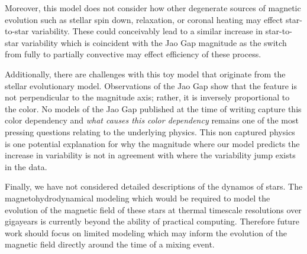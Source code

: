 Moreover, this model does not consider how other degenerate sources of magnetic
evolution such as stellar spin down, relaxation, or coronal heating may effect
star-to-star variability. These could conceivably lead to a similar increase in
star-to-star variability which is coincident with the Jao Gap magnitude as the
switch from fully to partially convective may effect efficiency of these
process.

Additionally, there are challenges with this toy model that originate from the
stellar evolutionary model. Observations of the Jao Gap show that the feature
is not perpendicular to the magnitude axis; rather, it is inversely
proportional to the color. No models of the Jao Gap published at the time of
writing capture this color dependency and \textit{what causes this color
dependency} remains one of the most pressing questions relating to the
underlying physics. This non captured physics is one potential explanation for
why the magnitude where our model predicts the increase in variability is not
in agreement with where the variability jump exists in the data.

Finally, we have not considered detailed descriptions of the dynamos of stars.
The magnetohydrodynamical modeling which would be required to model the
evolution of the magnetic field of these stars at thermal timescale resolutions
over gigayears is currently beyond the ability of practical computing.
Therefore future work should focus on limited modeling which may inform the
evolution of the magnetic field directly around the time of a mixing event.
